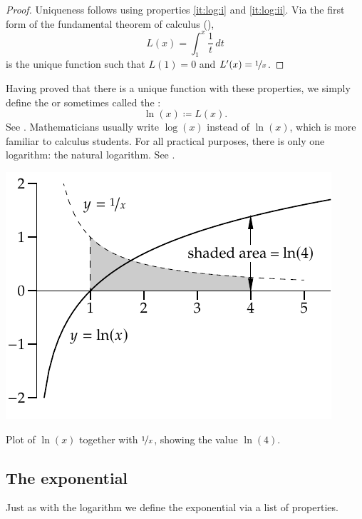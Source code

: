 \begin{proof}
Uniqueness follows using properties \ref{it:log:i} and
\ref{it:log:ii}.  Via the first form of the
fundamental theorem of calculus (),
\begin{equation*}
L(x) = \int_1^x \frac{1}{t}\,dt
\end{equation*}
is the unique function such that $L(1) = 0$ and $L'(x) = \nicefrac{1}{x}$.
\end{proof}

Having proved
that there is a unique function with these properties,
we simply define the \emph{} or sometimes called the
\emph{}:
\begin{equation*}
\ln(x) \coloneqq L(x) .
\end{equation*}
See .
Mathematicians usually write $\log(x)$ instead of $\ln(x)$, which is
more familiar to calculus students.  For all practical purposes, there is only one logarithm:
the natural logarithm.  See .
\begin{myfigureht}
\includegraphics{figures/logfig}
\caption{Plot of $\ln(x)$ together with $\nicefrac{1}{x}$, showing the value
$\ln(4)$.\label{fig:log}}
\end{myfigureht}

\subsection{The exponential}

Just as with the logarithm we define the exponential via a list of
properties.

